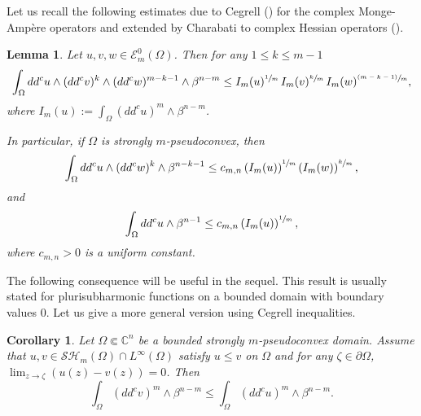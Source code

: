 \documentclass[JEP,XML,SOM,Unicode]{cedram}
\newcommand{\psfrac}[2]{\sfrac{(#1)}{#2}}
\newtheorem{lemma}[theorem]{Lemma}
\newtheorem{corollary}[theorem]{Corollary}
\theoremstyle{definition}
\renewcommand{\C}{\mathbb{C}}
\begin{document}
Let us recall the following estimates due to Cegrell (\cite{Ceg04}) for the complex Monge-Ampère operators and extended by Charabati to complex Hessian operators (\cite{Ch16}).

\begin{lemma} \label{lem:Cegrell} Let $u, v, w \in\mathcal{E}_m^0(\Omega)$. Then for any $1 \leq k \leq m - 1$
\[
\int_{\Omega}dd^cu\wedge(dd^cv)^k\wedge(dd^cw)^{m-k-1}\wedge\beta^{n-m}
\leq I_m (u)^{\sfrac{1}{m}} \, I_m (v)^{\sfrac{k}{m}} \, I_m (w)^{\psfrac{m-k-1}{m}},
\]
where $I_m (u):= \int_{\Omega}(dd^c u)^m \wedge \beta^{n-m}$.

In particular, if $\Omega$ is strongly $m$-pseudoconvex, then
\[
\int_{\Omega}dd^c u \wedge (dd^c w)^k \wedge\beta^{n-k -1} \leq c_{m,n} \left(I_m (u)\right)^{\sfrac{1}{m}} \left(I_m (w)\right)^{\sfrac{k}{m}},
\]
and
\[
\int_{\Omega}dd^c u \wedge \beta^{n-1} \leq c_{m,n} \left(I_m (u)\right)^{\sfrac{1}{m}},
\]
where $c_{m,n} > 0$ is a uniform constant.
\end{lemma}

The following consequence will be useful in the sequel. This result is usually stated for plurisubharmonic functions on a bounded domain with boundary values $0$. Let us give a more general version using Cegrell inequalities.

\begin{corollary} \label{coro:comparison principle} Let $\Omega \Subset \C^n$ be a bounded strongly $m$-pseudoconvex domain. Assume that $u,v\in \mathcal{SH}_m(\Omega)\cap L^{\infty}(\Omega)$ satisfy $u \leq v$ on $\Omega$ and for any $\zeta \in \partial \Omega$, $\lim_{z \to \zeta }(u(z)- v(z))= 0$.
Then
\[
\int_{\Omega}(dd^c v)^m\wedge\beta^{n-m} \leq \int_{\Omega}(dd^c u)^m\wedge\beta^{n-m}.
\]
\end{corollary}
\end{document}
